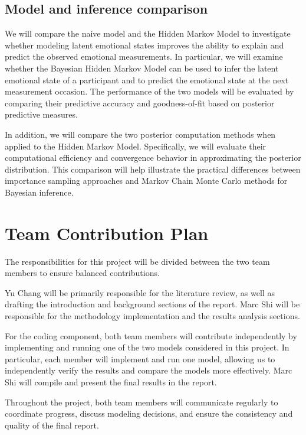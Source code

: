 \documentclass[a4paper,11pt]{article}
\begin{document}
\subsection{Model and inference comparison}

We will compare the naive model and the Hidden Markov Model to investigate whether modeling latent emotional states improves the ability to explain and predict the observed emotional measurements. In particular, we will examine whether the Bayesian Hidden Markov Model can be used to infer the latent emotional state of a participant and to predict the emotional state at the next measurement occasion. The performance of the two models will be evaluated by comparing their predictive accuracy and goodness-of-fit based on posterior predictive measures.

In addition, we will compare the two posterior computation methods when applied to the Hidden Markov Model. Specifically, we will evaluate their computational efficiency and convergence behavior in approximating the posterior distribution. This comparison will help illustrate the practical differences between importance sampling approaches and Markov Chain Monte Carlo methods for Bayesian inference.


\section{Team Contribution Plan}

The responsibilities for this project will be divided between the two team members to ensure balanced contributions.

Yu Chang will be primarily responsible for the literature review, as well as drafting the introduction and background sections of the report. Marc Shi will be responsible for the methodology implementation and the results analysis sections.

For the coding component, both team members will contribute independently by implementing and running one of the two models considered in this project. In particular, each member will implement and run one model, allowing us to independently verify the results and compare the models more effectively. Marc Shi will compile and present the final results in the report.

Throughout the project, both team members will communicate regularly to coordinate progress, discuss modeling decisions, and ensure the consistency and quality of the final report.


\clearpage

\end{document}
